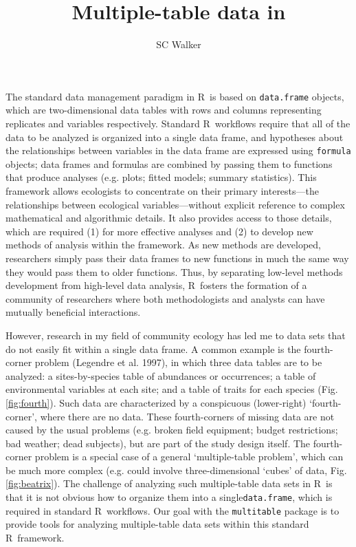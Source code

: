 \documentclass{article}
\title{Multiple-table data in \R}
\author{SC Walker}
\newcommand{\R}{{\sf R}}
\newcommand{\code}[1]{\texttt{#1}}
\numberwithin{exercise}{section}
\begin{document}
\maketitle

The standard data management paradigm in \R\ is based on \code{data.frame} objects, which are two-dimensional data tables with rows and columns representing replicates and variables respectively.  Standard \R\ workflows require that all of the data to be analyzed is organized into a single data frame, and hypotheses about the relationships between variables in the data frame are expressed using \code{formula} objects; data frames and formulas are combined by passing them to functions that produce analyses (e.g. plots; fitted models; summary statistics).  This framework allows ecologists to concentrate on their primary interests---the relationships between ecological variables---without explicit reference to complex mathematical and algorithmic details.  It also provides access to those details, which are required (1) for more effective analyses and (2) to develop new methods of analysis within the framework.  As new methods are developed, researchers simply pass their data frames to new functions in much the same way they would pass them to older functions.  Thus, by separating low-level methods development from high-level data analysis, \R\ fosters the formation of a community of researchers where both methodologists and analysts can have mutually beneficial interactions.

However, research in my field of community ecology has led me to data sets that do not easily fit within a single data frame.  A common example is the fourth-corner problem (Legendre et al. 1997), in which three data tables are to be analyzed: a sites-by-species table of abundances or occurrences; a table of environmental variables at each site; and a table of traits for each species (Fig. \ref{fig:fourth}).  Such data are characterized by a conspicuous (lower-right) `fourth-corner', where there are no data.  These fourth-corners of missing data are not caused by the usual problems (e.g. broken field equipment; budget restrictions; bad weather; dead subjects), but are part of the study design itself.  The fourth-corner problem is a special case of a general `multiple-table problem', which can be much more complex (e.g. could involve three-dimensional `cubes' of data, Fig. \ref{fig:beatrix}).  The challenge of analyzing such multiple-table data sets in \R\ is that it is not obvious how to organize them into a single\code{data.frame}, which is required in standard \R\ workflows.  Our goal with the \code{multitable} package is to provide tools for analyzing multiple-table data sets within this standard \R\ framework.
\end{document}
